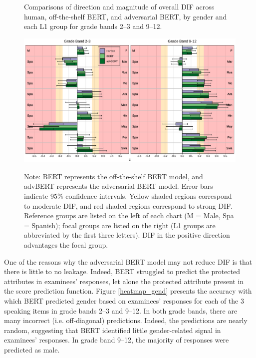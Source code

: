 \documentclass [PhD] {uclathes}
\begin{document}
\begin{figure}[!htb]
    \centering
    \caption{Comparisons of direction and magnitude of overall DIF across human, off-the-shelf BERT, and adversarial BERT, by gender and each L1 group for grade bands 2–3 and 9–12.}    
    \includegraphics[width=6.5in]{figures/20230517_ETS-DIF_advBERT_z_ovr_edit.pdf}
    \label{advBERT_z_ovr}
\caption*{\small Note: BERT represents the off-the-shelf BERT model, and advBERT represents the adversarial BERT model. Error bars indicate 95\% confidence intervals. Yellow shaded regions correspond to moderate DIF, and red shaded regions correspond to strong DIF. Reference groups are listed on the left of each chart (M = Male, Spa = Spanish); focal groups are listed on the right (L1 groups are abbreviated by the first three letters). DIF in the positive direction advantages the focal group.}
\end{figure}

One of the reasons why the adversarial BERT model may not reduce DIF is that there is little to no leakage. Indeed, BERT struggled to predict the protected attributes in examinees’ responses, let alone the protected attribute present in the score prediction function. Figure \ref{heatmap_gend} presents the accuracy with which BERT predicted gender based on examinees’ responses for each of the 3 speaking items in grade bands 2–3 and 9–12. In both grade bands, there are many incorrect (i.e. off-diagonal) predictions. Indeed, the predictions are nearly random, suggesting that BERT identified little gender-related signal in examinees’ responses. In grade band 9–12, the majority of responses were predicted as male. 
\end{document}
